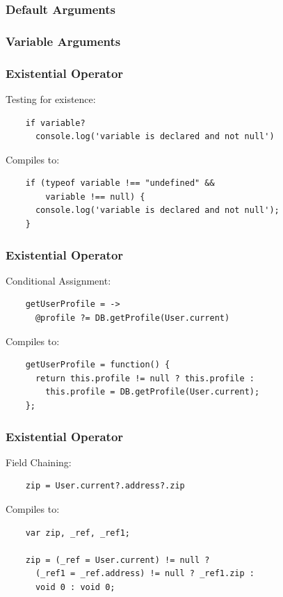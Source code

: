 \documentclass{beamer}
\begin{document}
\begin{frame}
  \frametitle{Default Arguments}
  
\end{frame}

\begin{frame}
\frametitle{Variable Arguments}

\end{frame}

%
%
 \begin{frame}[fragile]
  \frametitle{Existential Operator}


  Testing for existence:

  \begin{verbatim}
    if variable?
      console.log('variable is declared and not null')
  \end{verbatim}


  Compiles to:

  \begin{verbatim}
    if (typeof variable !== "undefined" && 
        variable !== null) {
      console.log('variable is declared and not null');
    }
  \end{verbatim}  
\end{frame}

%
%
 \begin{frame}[fragile]
  \frametitle{Existential Operator}


  Conditional Assignment:

  \begin{verbatim}
    getUserProfile = ->
      @profile ?= DB.getProfile(User.current)
  \end{verbatim}


  Compiles to:

  \begin{verbatim}
    getUserProfile = function() {
      return this.profile != null ? this.profile : 
        this.profile = DB.getProfile(User.current);
    };
  \end{verbatim}  
\end{frame}

 \begin{frame}[fragile]
  \frametitle{Existential Operator}


  Field Chaining:

  \begin{verbatim}
    zip = User.current?.address?.zip
  \end{verbatim}

  Compiles to:

  \begin{verbatim}
    var zip, _ref, _ref1;

    zip = (_ref = User.current) != null ? 
      (_ref1 = _ref.address) != null ? _ref1.zip : 
      void 0 : void 0;
  \end{verbatim}  
\end{frame}
\end{document}
